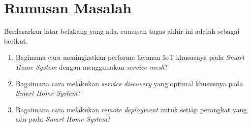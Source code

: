\section{Rumusan Masalah}

Berdasarkan latar belakang yang ada, rumusan tugas akhir ini adalah sebagai berikut.
\begin{enumerate}
  \item Bagimana cara meningkatkan performa layanan IoT khususnya pada \textit{Smart Home System} dengan menggunakan \textit{service mesh}?
  \item Bagaimana cara melakukan \textit{service discovery} yang optimal khususnya pada \textit{Smart Home System}?
  \item Bagaimana cara melakukan \textit{remote deployment} untuk setiap perangkat yang ada pada \textit{Smart Home System}?
\end{enumerate}